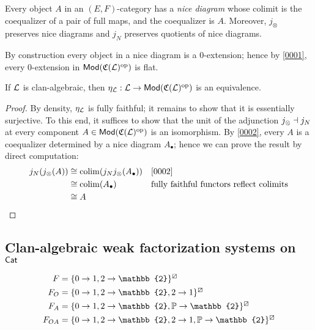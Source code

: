 \documentclass[a4paper]{article}
\begin{document}
\begin{fact}\label{0002}
  Every object $A$ in an $(E,F)$-category has a \emph{nice diagram} whose colimit is the coequalizer of a pair of full maps, and the coequalizer is $A$.
  Moreover, $j_{\otimes}$ preserves nice diagrams and $j_N$ preserves quotients of nice diagrams.
\end{fact}

\begin{remark}
  By construction every object in a nice diagram is a $0$-extension; hence by \cref{0001}, every $0$-extension in $\mathsf{Mod}(\mathfrak{C}(\mathcal{L})^{\mathrm{op}})$ is flat.
\end{remark}

\begin{theorem}
  If $\mathcal{L}$ is clan-algebraic, then $\eta_{\mathcal{L}} : \mathcal{L} \to \mathsf{Mod}(\mathfrak{C}(\mathcal{L})^{\mathrm{op}})$ is an equivalence.
\end{theorem}
\begin{proof}
  By density, $\eta_{\mathcal{L}}$ is fully faithful; it remains to show that it is essentially surjective.
  To this end, it suffices to show that the unit of the adjunction $j_{\otimes} \dashv j_{N}$ at every component $A \in \mathsf{Mod}(\mathfrak{C}(\mathcal{L})^{\mathrm{op}})$ is an isomorphism.
  By \cref{0002}, every $A$ is a coequalizer determined by a nice diagram $A_{\bullet}$; hence we can prove the result by direct computation:
  \begin{align*}
    j_N(j_{\otimes}(A)) &\iso \colim(j_Nj_{\otimes}(A_{\bullet})) && \text{\cref{0002}}\\
                  &\iso \colim(A_{\bullet}) && \text{fully faithful functors reflect colimits}\\
                  &\iso A
  \end{align*}
\end{proof}

\subsection{Clan-algebraic weak factorization systems on $\mathsf{Cat}$}

\begin{align*}
  F &= \rLift{\{0 \to 1, 2 \to \mathbb{2}\}}\\
  F_O &= \rLift{\{0 \to 1, 2 \to \mathbb{2}, 2 \to 1\}}\\
  F_A &= \rLift{\{0 \to 1, 2 \to \mathbb{2}, \PP \to \mathbb{2}\}}\\
  F_{OA} &= \rLift{\{0 \to 1, 2 \to \mathbb{2}, 2 \to 1, \PP \to \mathbb{2}\}}
\end{align*}
\end{document}
